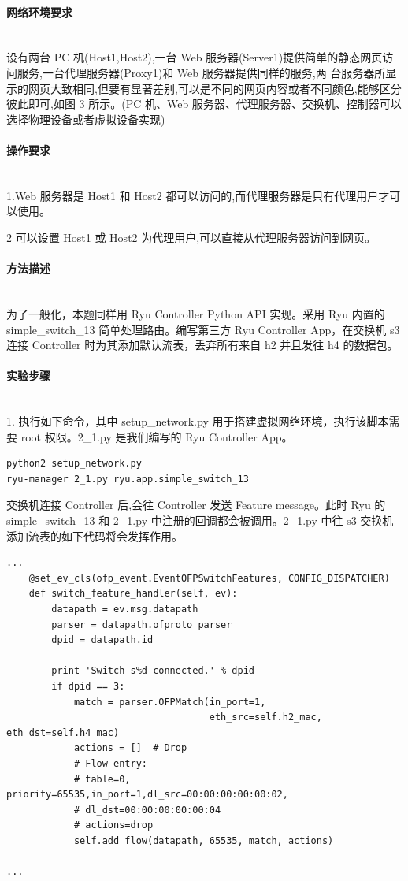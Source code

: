 \documentclass[format=draft,language=chinese,category=SDN]{hustreport}
\newcommand{\myparagraph}[1]{\paragraph{#1}\mbox{}\\}
\begin{document}
\myparagraph{网络环境要求}

设有两台 PC 机(Host1,Host2),一台 Web 服务器(Server1)提供简单的静态网页访问服务,一台代理服务器(Proxy1)和 Web 服务器提供同样的服务,两
台服务器所显示的网页大致相同,但要有显著差别,可以是不同的网页内容或者不同颜色,能够区分彼此即可,如图 3 所示。(PC 机、Web 服务器、代理服务器、交换机、控制器可以选择物理设备或者虚拟设备实现)

\myparagraph{操作要求}

1.Web 服务器是 Host1 和 Host2 都可以访问的,而代理服务器是只有代理用户才可以使用。

2 可以设置 Host1 或 Host2 为代理用户,可以直接从代理服务器访问到网页。

\myparagraph{方法描述}

为了一般化，本题同样用 Ryu Controller Python API 实现。采用 Ryu 内置的 simple\_switch\_13 简单处理路由。编写第三方 Ryu Controller App，在交换机 s3 连接 Controller 时为其添加默认流表，丢弃所有来自 h2 并且发往 h4 的数据包。

\myparagraph{实验步骤}

1. 执行如下命令，其中 setup\_network.py 用于搭建虚拟网络环境，执行该脚本需要 root 权限。2\_1.py 是我们编写的 Ryu Controller App。

\begin{lstlisting}
python2 setup_network.py
ryu-manager 2_1.py ryu.app.simple_switch_13
\end{lstlisting}

交换机连接 Controller 后,会往 Controller 发送 Feature message。此时 Ryu 的 simple\_switch\_13 和 2\_1.py 中注册的回调都会被调用。2\_1.py 中往 s3 交换机添加流表的如下代码将会发挥作用。

\begin{lstlisting}
...
    @set_ev_cls(ofp_event.EventOFPSwitchFeatures, CONFIG_DISPATCHER)
    def switch_feature_handler(self, ev):
        datapath = ev.msg.datapath
        parser = datapath.ofproto_parser
        dpid = datapath.id

        print 'Switch s%d connected.' % dpid
        if dpid == 3:
            match = parser.OFPMatch(in_port=1,
                                    eth_src=self.h2_mac, eth_dst=self.h4_mac)
            actions = []  # Drop
            # Flow entry:
            # table=0, priority=65535,in_port=1,dl_src=00:00:00:00:00:02,
            # dl_dst=00:00:00:00:00:04
            # actions=drop
            self.add_flow(datapath, 65535, match, actions)

...
\end{lstlisting}
\end{document}
